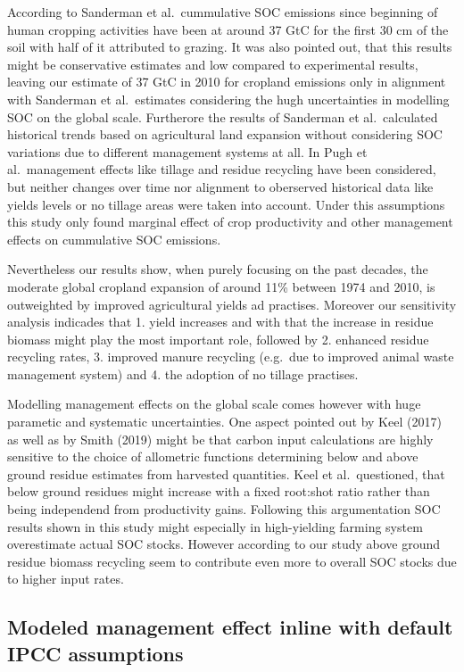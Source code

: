 \documentclass[gc, manuscript]{copernicus}
\begin{document}
According to Sanderman et al.~cummulative SOC emissions since beginning
of human cropping activities have been at around 37 GtC for the first 30
cm of the soil with half of it attributed to grazing. It was also
pointed out, that this results might be conservative estimates and low
compared to experimental results, leaving our estimate of 37 GtC in 2010
for cropland emissions only in alignment with Sanderman et al.~estimates
considering the hugh uncertainties in modelling SOC on the global scale.
Furtherore the results of Sanderman et al.~calculated historical trends
based on agricultural land expansion without considering SOC variations
due to different management systems at all. In Pugh et al.~management
effects like tillage and residue recycling have been considered, but
neither changes over time nor alignment to oberserved historical data
like yields levels or no tillage areas were taken into account. Under
this assumptions this study only found marginal effect of crop
productivity and other management effects on cummulative SOC emissions.

Nevertheless our results show, when purely focusing on the past decades,
the moderate global cropland expansion of around 11\% between 1974 and
2010, is outweighted by improved agricultural yields ad practises.
Moreover our sensitivity analysis indicades that 1. yield increases and
with that the increase in residue biomass might play the most important
role, followed by 2. enhanced residue recycling rates, 3. improved
manure recycling (e.g.~due to improved animal waste management system)
and 4. the adoption of no tillage practises.

Modelling management effects on the global scale comes however with huge
parametic and systematic uncertainties. One aspect pointed out by Keel
(2017) as well as by Smith (2019) might be that carbon input
calculations are highly sensitive to the choice of allometric functions
determining below and above ground residue estimates from harvested
quantities. Keel et al.~questioned, that below ground residues might
increase with a fixed root:shot ratio rather than being independend from
productivity gains. Following this argumentation SOC results shown in
this study might especially in high-yielding farming system overestimate
actual SOC stocks. However according to our study above ground residue
biomass recycling seem to contribute even more to overall SOC stocks due
to higher input rates.

\subsection{Modeled management effect inline with default IPCC
assumptions}
\end{document}
